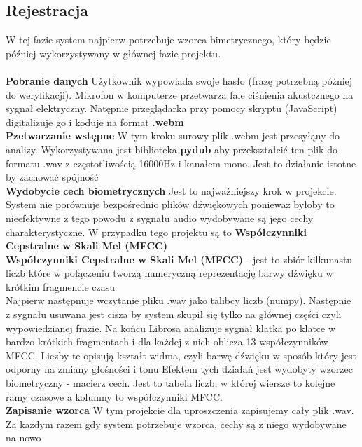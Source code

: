 \subsection{Rejestracja}
W tej fazie system najpierw potrzebuje wzorca bimetrycznego, który będzie później wykorzystywany w głównej fazie projektu.
\\
\\
\textbf{Pobranie danych}\newline
Użytkownik wypowiada swoje hasło (frazę potrzebną później do weryfikacji). Mikrofon w komputerze przetwarza fale ciśnienia akustcznego na sygnał elektryczny. Natępnie przeglądarka przy pomocy skryptu (JavaScript) digitalizuje go i koduje na format \textbf{.webm}
\newline
\\
\textbf{Pzetwarzanie wstępne}\newline
W tym kroku surowy plik .webm jest przesyłąny do analizy. Wykorzystywana jest biblioteka \textbf{pydub} aby przekształcić ten plik do formatu .wav z częstotliwością 16000Hz i kanałem mono. Jest to działanie istotne by zachować spójność
\newline
\\
\textbf{Wydobycie cech biometrycznych}\newline
Jest to najważniejszy krok w projekcie. System nie porównuje bezpośrednio plików dźwiękowych ponieważ byłoby to nieefektywne z tego powodu z sygnału audio wydobywane są jego cechy charakterystyczne. W przypadku tego projektu są to \textbf{Współczynniki Cepstralne w Skali Mel (MFCC)}
\newline
\\
\textbf{Współczynniki Cepstralne w Skali Mel (MFCC)} - jest to zbiór kilkunastu liczb które w połączeniu tworzą numeryczną reprezentację barwy dźwięku w krótkim fragmencie czasu
\newline
\\
Najpierw następnuje wczytanie pliku .wav jako talibcy liczb (numpy). Następnie z sygnału usuwana jest cisza by system skupił się tylko na głównej części czyli wypowiedzianej frazie. Na końcu Librosa analizuje sygnał klatka po klatce w bardzo krótkich fragmentach i dla każdej z nich oblicza 13 współczynników MFCC. Liczby te opisują kształt widma, czyli barwę dźwięku w sposób który jest odporny na zmiany głośności i tonu
\newline
Efektem tych działań jest wydobyty wzorzec biometryczny - macierz cech. Jest to tabela liczb, w której wiersze to kolejne ramy czasowe a kolumny to współczynniki MFCC.
\newline
\\
\textbf{Zapisanie wzorca}\newline
W tym projekcie dla uproszczenia zapisujemy cały plik .wav. Za każdym razem gdy system potrzebuje wzorca, cechy są z niego wydobywane na nowo

